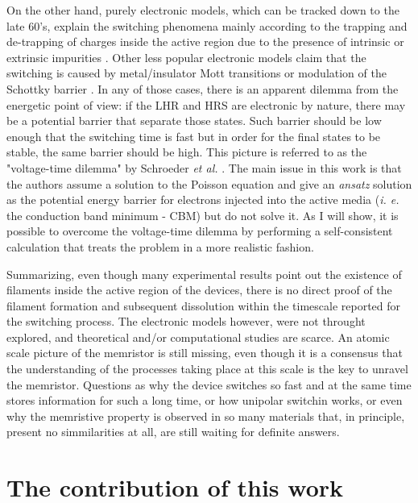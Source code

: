On the other hand, purely electronic models, which can be tracked down to the late 60's, explain the switching phenomena mainly according to the trapping and de-trapping of charges inside the active region due to the presence of intrinsic or extrinsic impurities \cite{Simmons1967}. Other less popular electronic models claim that the switching is caused by metal/insulator Mott transitions \cite{Stoliar2013,Yalishev2012} or modulation of the Schottky barrier \cite{Marchewka2015}. In any of those cases, there is an apparent dilemma from the energetic point of view: if the LHR and HRS are electronic by nature, there may be a potential barrier that separate those states. Such barrier should be low enough that the switching time is fast but in order for the final states to be stable, the same barrier should be high. This picture is referred to as the "voltage-time dilemma" by Schroeder {\em et al.} \cite{Schroeder2010}. The main issue in this work is that the authors assume a solution to the Poisson equation and give an {\em ansatz} solution as the potential energy barrier for electrons injected into the active media ({\em i. e.} the conduction band minimum - CBM) but do not solve it. As I will show, it is possible to overcome the voltage-time dilemma by performing a self-consistent calculation that treats the problem in a more realistic fashion.

Summarizing, even though many experimental results point out the existence of filaments inside the active region of the devices, there is no direct proof of the filament formation and subsequent dissolution within the timescale reported for the switching process. The electronic models however, were not throught explored, and theoretical and/or computational studies are scarce. An atomic scale picture of the memristor is still missing, even though it is a consensus that the understanding of the processes taking place at this scale is the key to unravel the memristor. Questions as why the device switches so fast and at the same time stores information for such a long time, or how unipolar switchin works, or even why the memristive property is observed in so many materials that, in principle, present no simmilarities at all, are still waiting for definite answers.

\section{The contribution of this work}
\label{sec:contrib}

